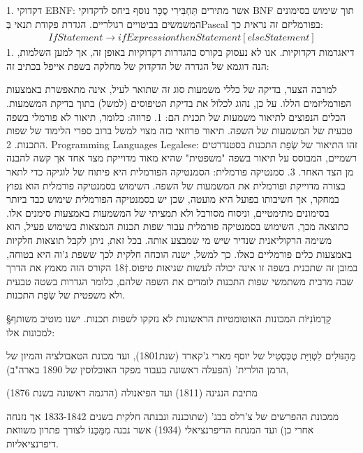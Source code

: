       1. דקדוקי EBNF: אשר מתירים תַּחְבִּירִי סֻכָּר נוסף ביחס לדקדוקי BNF תוך שימוש בסימונים המשמשים בביטויים רגולריים. הגדרת פקודת תנאי בְּPascal בפורמליזם זה נראית כך:
      \begin{align}
      IfStatement→if Expression then Statement [else Statement]
    \end{align}
      1. דיאגרמות דקדוקיות. אנו לא נעסוק בקורס בהגדרות דקדוקיות באופן זה, אך למען השלמות, הנה דוגמא של הגדרה של הדקדוק של מחלקה בשפת אייפל בכתיב זה:

      למרבה הצער, בדיקה של כללי משמעות סוג זה שתואר לעיל, אינה מתאפשרת באמצעות
      הפורמליזמים הללו. על כן, נהוג לכלול את בדיקת הטיפוסים (למשל) בתוך בדיקת
      המשמעות. הכלים הנפוצים לתיאור משמעות של תכנית הם:
      1. פרוזה: כלומר, תיאור לא פורמלי בשפה טבעית של המשמעות של השפה. תיאור פרוזאי כזה מצוי למשל ברוב ספרי הלימוד של שפות התכנות.
      2. Programming Languages Legalese: זהו התיאור של שְׂפַת התכנות בסטנדרטים רשמיים, המבוסס על תיאור בשפה "משפטית" שהיא מאוד מדוייקת מצד אחד אך קשה להבנה מן הצד האחר.
      3. סמנטיקה פורמלית: הסמנטיקה הפורמלית היא פיתוח של לוגיקה כדי לתאר בצורה מדוייקת ופורמלית את המשמעות של השפה.
      השימוש בסמנטיקה פורמלית הוא נפוץ במחקר, אך חשיבותו בפועל היא מועטה, שכן יש בסמנטיקה הפורמלית שימוש כבד ביותר בסימונים מתימטיים, וניסוח מסורבל ולא תמציתי של המשמעות באמצעות סימנים אלו. כתוצאה מכך, השימוש בסמנטיקה פורמלית עבור שפות תכנות הנמצאות בשימוש פעיל, הוא משימה הרקוליאנית שנדיר שיש מי שמבצע אותה.
      בכל זאת, ניתן לקבל תוצאות חלקיות באמצעות כלים פורמליים כאלו. כך למשל, ישנה הוכחה חלקית לכך ששפת ג'וה היא בטוחה, במובן זה שתכנית בשפה זו אינה יכולה לעשות שגיאות טיפוס.†{18}
      הקורס הזה מאמץ את הדרך שבה מרבית משתמשי שפות התכנות לומדים את השפה שלהם, כלומר
      הגדרות בשטה טבעית ולא משפטית של שְׂפַת התכנות.

     §קַדְמוֹנִיּוֹת
     המכונות האוטומטיות הראשונות לא נזקקו לשפות תכנות. ישנו מוטיב משותף למכונות אלו:
     \begin{ציינון}
\item מֵהַנּוּלִים לִטְוִיַּת טֶכְּסְטִיל של יוסף מארי ג'קארד (שנת1801), ועד מכונת הטאבולציה והמיון של הרמן הולרית' (הפעלה ראשונה בעבור מפקד האוכלוסין של 1890 בארה"ב),
\item מתיבת הנגינה (1811) ועד הפיאנולה (הדגמה ראשונה בשנת 1876)
\item ממכונת ההפרשים של צ'רלס בבג' (שתוכננה ונבנתה חלקית בשנים 1833-1842 אך נזנחה אחרי כן) ועד המנתח הדיפרנציאלי (1934) אשר נבנה מִמֵּכָּנוֹ לצורך פתרון משוואת דיפרנציאליות.
        \end{ציינון}

